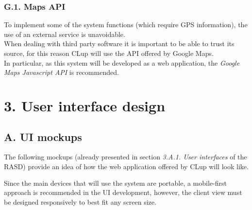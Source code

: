 \subsection{G.1. Maps API}

To implement some of the system functions (which require GPS information), the use of an external service is unavoidable.\\
When dealing with third party software it is important to be able to trust its source, for this reason CLup will use the API offered by Google Maps.\\
In particular, as this system will be developed as a web application, the \emph{Google Maps Javascript API} is recommended.

\chapter{3. User interface design}

\section{A. UI mockups}

The following mockups (already presented in section \emph{3.A.1. User interfaces} of the RASD) provide an idea of how the web application offered by CLup will look like.

Since the main devices that will use the system are portable, a mobile-first approach is recommended in the UI development, however, the client view must be designed responsively to best fit any screen size.

